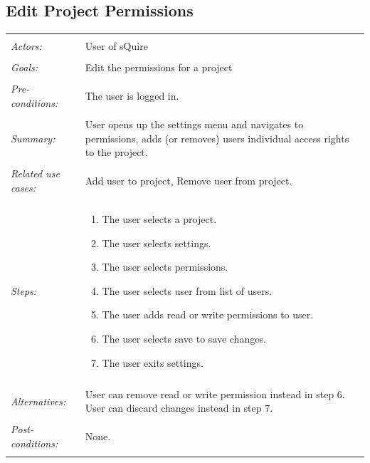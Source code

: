 \documentclass[11pt]{report}
\begin{document}
\subsection{Edit Project Permissions}
\begin{tabular}{ p{2cm} p{12cm} }
 \hline
 \\
 \textit{Actors:} & User of sQuire \\ 
 \\
 \textit{Goals:} & Edit the permissions for a project \\
 \\
 \textit{Pre-conditions:} & The user is logged in. \\
 \\
 \textit{Summary:} & User opens up the settings menu and navigates to permissions, adds (or removes) users individual access rights to the project.  \\ 
 \\
 \textit{Related use cases:} & Add user to project, Remove user from project. \\ 
 \\
 \textit{Steps:} & \begin{enumerate}
  \item The user selects a project.
  \item The user selects settings.
  \item The user selects permissions.
  \item The user selects user from list of users.
  \item The user adds read or write permissions to user.
  \item The user selects save to save changes.
  \item The user exits settings.
 \end{enumerate} \\
 \\
 \textit{Alternatives:} & User can remove read or write permission instead in step 6. User can discard changes instead in step 7. \\
 \\
 \textit{Post-conditions:} & None. \\
 \\
\hline
\end{tabular}
\end{document}

